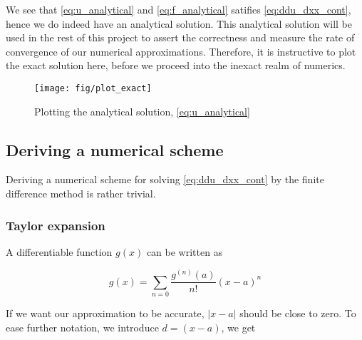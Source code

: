 \documentclass[a4paper]{article}
\begin{document}
We see that \eqref{eq:u_analytical} and \eqref{eq:f_analytical} satifies \eqref{eq:ddu_dxx_cont}, hence we do indeed have an analytical solution.
This analytical solution will be used in the rest of this project to assert the correctness and measure the rate of convergence of our numerical approximations.
Therefore, it is instructive to plot the exact solution here, before we proceed into the inexact realm of numerics.



\begin{figure}[ht]
\texttt{[image: fig/plot\_exact]}
\caption{Plotting the analytical solution, \eqref{eq:u_analytical}}
\end{figure}

\subsection{Deriving a numerical scheme}
Deriving a numerical scheme for solving \eqref{eq:ddu_dxx_cont} by the finite difference method is rather trivial.

\subsubsection{Taylor expansion}
\label{sec:taylor}
A differentiable function $g(x)$ can be written as

\begin{equation}
    g(x) = \sum_{n=0} \frac{g^{(n)}(a)}{n!} (x-a)^n
\end{equation}

If we want our approximation to be accurate, $|x - a|$ should be close to zero. To ease further notation, we introduce $d = (x - a)$, we get
\end{document}
